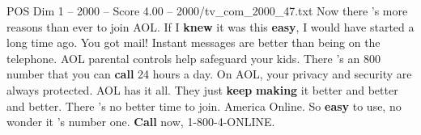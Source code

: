 \begin{textsample}{POS Dim 1 – 2000 – Score 4.00 – 2000/tv\_com\_2000\_47.txt}  \label{ex:f1_pos_076}
Now there 's more reasons than ever to join AOL.
If I \textbf{knew} it was this \textbf{easy}, I would have started a long time ago.
You got mail!
Instant messages are better than being on the telephone.
AOL parental controls help safeguard your kids.
There 's an 800 number that you can \textbf{call} 24 hours a day.
On AOL, your privacy and security are always protected.
AOL has it all.
They just \textbf{keep} \textbf{making} it better and better and better.
There 's no better time to join.
America Online.
So \textbf{easy} to use, no wonder it 's number one. \textbf{Call} now, 1-800-4-ONLINE.

\end{textsample}
